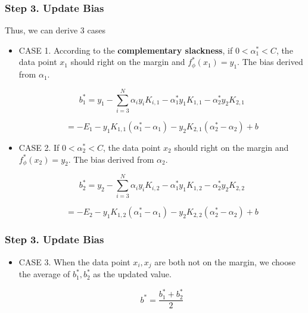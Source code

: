 \documentclass[xcolor=pdftex,dvipsnames,table,handout]{beamer}
\begin{document}
\begin{frame}  
\frametitle{Step 3. Update Bias}
Thus, we can derive 3 cases

\begin{itemize}[<+->]
\item CASE 1. According to the \textbf{complementary slackness}, if $0 < \alpha_1^* < C$, the data point $x_1$ should right on the margin and $f_{\phi}^*(x_1) = y_1$. The bias derived from $\alpha_1$.

$$
b_1^* = y_1 - \sum_{i=3}^N \alpha_i y_i K_{i, 1} - \alpha_1^* y_1 K_{1, 1} - \alpha_2^* y_2 K_{2, 1}
$$

$$
= - E_1 - y_1 K_{1, 1} (\alpha_1^* - \alpha_1) - y_2 K_{2, 1} (\alpha_2^* - \alpha_2) + b
$$

\item CASE 2. If $0 < \alpha_2^* < C$, the data point $x_2$ should right on the margin and $f_{\phi}^*(x_2) = y_2$. The bias derived from $\alpha_2$.

$$
b_2^* = y_2 - \sum_{i=3}^N \alpha_i y_i K_{i, 2} - \alpha_1^* y_1 K_{1, 2} - \alpha_2^* y_2 K_{2, 2}
$$

$$
= - E_2 - y_1 K_{1, 2} (\alpha_1^* - \alpha_1) - y_2 K_{2, 2} (\alpha_2^* - \alpha_2) + b
$$
\end{itemize}
\end{frame}

\begin{frame}  
\frametitle{Step 3. Update Bias}
\begin{itemize}[<+->]
\item CASE 3. When the data point $x_i, x_j$ are both not on the margin, we choose the average of $b_1^*, b_2^*$ as the updated value.

$$
b^* = \frac{b_1^* + b_2^*}{2}
$$
\end{itemize}
\end{frame}
\end{document}
